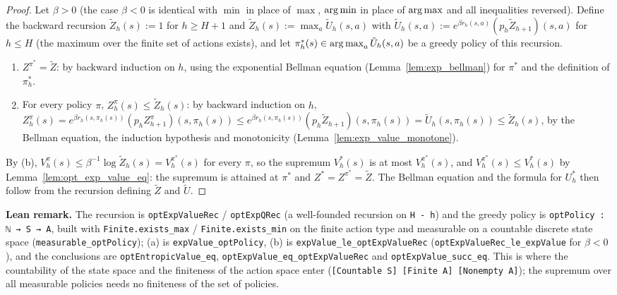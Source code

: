 \begin{proof}
\leanok
Let $\beta > 0$ (the case $\beta < 0$ is identical with $\min$ in place of $\max$, $\operatorname*{arg\,min}$ in
place of $\operatorname*{arg\,max}$ and all inequalities reversed). Define the backward recursion
$\tilde Z_h(s) := 1$ for $h \ge H + 1$ and
$\tilde Z_h(s) := \max_a \tilde U_h(s, a)$ with
$\tilde U_h(s, a) := e^{\beta r_h(s, a)} (p_h \tilde Z_{h+1})(s, a)$ for $h \le H$ (the maximum
over the finite set of actions exists), and let $\pi^*_h(s) \in \operatorname*{arg\,max}_a \tilde U_h(s, a)$ be a
greedy policy of this recursion.
\begin{enumerate}
  \item[(a)] $Z^{\pi^*} = \tilde Z$: by backward induction on $h$, using the exponential
        Bellman equation (Lemma~\ref{lem:exp_bellman}) for $\pi^*$ and the definition of $\pi^*_h$.
  \item[(b)] For every policy $\pi$, $Z^\pi_h(s) \le \tilde Z_h(s)$: by backward induction on $h$,
        $Z^\pi_h(s) = e^{\beta r_h(s, \pi_h(s))}(p_h Z^\pi_{h+1})(s, \pi_h(s))
        \le e^{\beta r_h(s, \pi_h(s))}(p_h \tilde Z_{h+1})(s, \pi_h(s)) = \tilde U_h(s, \pi_h(s))
        \le \tilde Z_h(s)$, by the Bellman equation, the induction hypothesis and monotonicity
        (Lemma~\ref{lem:exp_value_monotone}).
\end{enumerate}
By (b), $V^\pi_h(s) \le \beta^{-1}\log \tilde Z_h(s) = V^{\pi^*}_h(s)$ for every $\pi$, so the supremum
$V^*_h(s)$ is at most $V^{\pi^*}_h(s)$, and $V^{\pi^*}_h(s) \le V^*_h(s)$ by
Lemma~\ref{lem:opt_exp_value_eq}: the supremum is attained at $\pi^*$ and
$Z^* = Z^{\pi^*} = \tilde Z$. The Bellman equation and the formula for $U^*_h$ then follow from
the recursion defining $\tilde Z$ and $\tilde U$.
\end{proof}

\textbf{Lean remark.} The recursion is \texttt{optExpValueRec} / \texttt{optExpQRec} (a
well-founded recursion on \texttt{H - h}) and the greedy policy is
\texttt{optPolicy : ℕ → S → A}, built with \texttt{Finite.exists\_max} /
\texttt{Finite.exists\_min} on the finite action type and measurable on a countable discrete
state space (\texttt{measurable\_optPolicy}); (a) is \texttt{expValue\_optPolicy}, (b) is
\texttt{expValue\_le\_optExpValueRec} (\texttt{optExpValueRec\_le\_expValue} for $\beta < 0$),
and the conclusions are \texttt{optEntropicValue\_eq}, \texttt{optExpValue\_eq\_optExpValueRec}
and \texttt{optExpValue\_succ\_eq}. This is where the countability of the state space and the
finiteness of the action space enter (\texttt{[Countable S] [Finite A] [Nonempty A]}); the
supremum over all measurable policies needs no finiteness of the set of policies.

